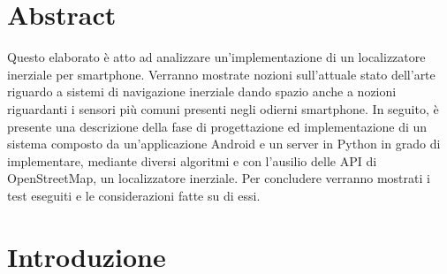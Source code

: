 \documentclass[12pt,a4paper,openright,twoside]{report}
\begin{document}
\chapter*{Abstract}                 %
Questo elaborato è atto ad analizzare un'implementazione di un localizzatore inerziale per smartphone. Verranno mostrate nozioni sull'attuale stato dell'arte riguardo a sistemi di navigazione inerziale dando spazio anche a nozioni riguardanti i sensori più comuni presenti negli odierni smartphone. In seguito, è presente una descrizione della fase di  progettazione ed implementazione di un sistema composto da un'applicazione Android e un server in Python in grado di implementare, mediante diversi algoritmi e con l'ausilio delle API di OpenStreetMap, un localizzatore inerziale. Per concludere verranno mostrati i test eseguiti e le considerazioni fatte su di essi.
\clearpage{\pagestyle{empty}\cleardoublepage}
\tableofcontents                        %
\rhead[\fancyplain{}{\bfseries\leftmark}]{\fancyplain{}{\bfseries\thepage}}
\clearpage{\pagestyle{empty}\cleardoublepage}
\listoffigures                          %

\clearpage{\pagestyle{empty}\cleardoublepage}
\chapter{Introduzione}                %
\lhead[\fancyplain{}{\bfseries\thepage}]{\fancyplain{}{\bfseries\rightmark}}
\end{document}
